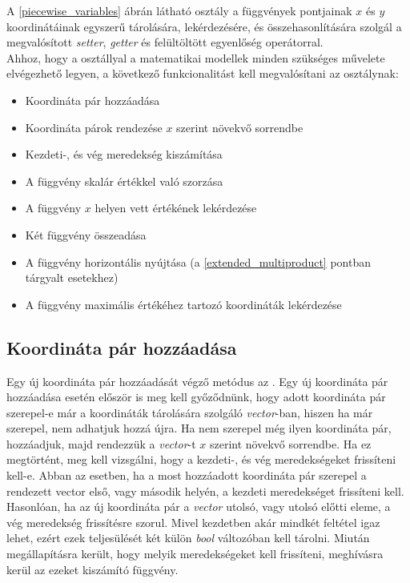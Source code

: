 A \ref{piecewise_variables} ábrán látható  osztály a függvények pontjainak $x$ és $y$ koordinátáinak egyszerű tárolására, lekérdezésére, és összehasonlítására szolgál a megvalósított \textit{setter}, \textit{getter} és felültöltött egyenlőség operátorral.\\
Ahhoz, hogy a  osztállyal a matematikai modellek minden szükséges művelete elvégezhető legyen, a következő funkcionalitást kell megvalósítani az osztálynak:
\begin{itemize}
\item Koordináta pár hozzáadása
\item Koordináta párok rendezése $x$ szerint növekvő sorrendbe
\item Kezdeti-, és vég meredekség kiszámítása
\item A függvény skalár értékkel való szorzása
\item A függvény $x$ helyen vett értékének lekérdezése
\item Két függvény összeadása
\item A függvény horizontális nyújtása (a \ref{extended_multiproduct} pontban tárgyalt esetekhez)
\item A függvény maximális értékéhez tartozó koordináták lekérdezése
\end{itemize} 
\subsection{Koordináta pár hozzáadása} \label{addCoordinates}
Egy új koordináta pár hozzáadását végző metódus az .
Egy új koordináta pár hozzáadása esetén először is meg kell győződnünk, hogy adott koordináta pár szerepel-e már a koordináták tárolására szolgáló \textit{vector}-ban, hiszen ha már szerepel, nem adhatjuk hozzá újra.
Ha nem szerepel még ilyen koordináta pár, hozzáadjuk, majd rendezzük a \textit{vector}-t $x$ szerint növekvő sorrendbe.
Ha ez megtörtént, meg kell vizsgálni, hogy a kezdeti-, és vég meredekségeket frissíteni kell-e.
Abban az esetben, ha a most hozzáadott koordináta pár szerepel a rendezett vector első, vagy második helyén, a kezdeti meredekséget frissíteni kell.
Hasonlóan, ha az új koordináta pár a \textit{vector} utolsó, vagy utolsó előtti eleme, a vég meredekség frissítésre szorul.
Mivel kezdetben akár mindkét feltétel igaz lehet, ezért ezek teljesülését két külön \textit{bool} változóban kell tárolni.
Miután megállapításra került, hogy melyik meredekségeket kell frissíteni, meghívásra kerül az ezeket kiszámító függvény. 
